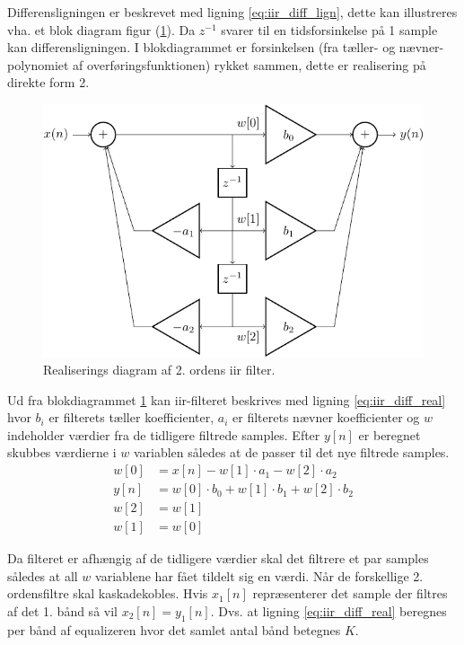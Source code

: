 Differensligningen er beskrevet med ligning \ref{eq:iir_diff_lign}, dette kan illustreres vha. et blok diagram figur (\ref{fig:real_diag}). 
Da $z^{-1}$ svarer til en tidsforsinkelse på 1 sample kan differensligningen. I blokdiagrammet er forsinkelsen 
(fra tæller- og nævner-polynomiet af overføringsfunktionen) rykket sammen, dette er realisering på direkte form 2. \cite{Tan2013}

   \begin{figure}[h]
        \centering
        \includegraphics[scale = 0.8]{figure/iir_sos-crop.pdf}
        \caption{Realiserings diagram af 2. ordens iir filter. }    
        \label{fig:real_diag}
    \end{figure}

   Ud fra blokdiagrammet \ref{fig:real_diag} kan iir-filteret beskrives med ligning \ref{eq:iir_diff_real} 
   hvor $b_i$ er filterets tæller koefficienter, $a_i$ er filterets nævner koefficienter og $w$ indeholder 
   værdier fra de tidligere filtrede samples. Efter $y[n]$ er beregnet skubbes værdierne i $w$ variablen  
 således at de passer til det nye filtrede samples. 
    \begin{align}
        w[0] &=x[n] - w[1] \cdot a_1 - w[2] \cdot a_2  \\
        y[n] &= w[0] \cdot b_0 + w[1] \cdot b_1 + w[2] \cdot b_2  
        \label{eq:iir_diff_real}
        \\
        w[2] &= w[1] \\
        w[1] &= w[0] 
    \end{align}

    Da filteret er afhængig af de tidligere værdier skal det filtrere et par samples således at all $w$ variablene 
    har fået tildelt sig en værdi.
Når de forskellige 2. ordensfiltre skal kaskadekobles. Hvis $x_{1}[n]$ repræsenterer det sample der filtres af det 1. bånd så vil $x_{2}[n] = y_{1}[n]$.
    Dvs. at ligning \ref{eq:iir_diff_real} beregnes per bånd af equalizeren hvor det samlet antal bånd betegnes $K$.\\

